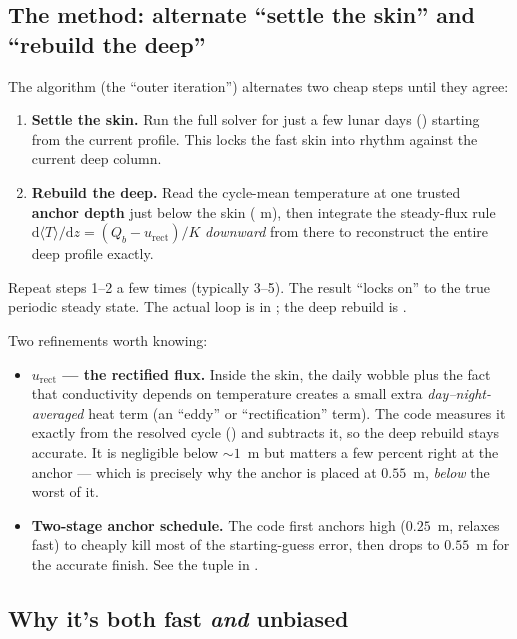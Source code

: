 \subsection{The method: alternate ``settle the skin'' and ``rebuild the deep''}

The algorithm (the ``outer iteration'') alternates two cheap steps until they
agree:
\begin{enumerate}[leftmargin=1.5em,itemsep=4pt]
  \item \textbf{Settle the skin.} Run the full solver for just a few lunar days
    () starting from the current profile. This locks the fast
    skin into rhythm against the current deep column.
  \item \textbf{Rebuild the deep.} Read the cycle-mean temperature at one trusted
    \textbf{anchor depth} just below the skin ( m), then
    integrate the steady-flux rule
    $\mathrm{d}\langle T\rangle/\mathrm{d}z = (Q_b - u_{\mathrm{rect}})/K$
    \emph{downward} from there to reconstruct the entire deep profile exactly.
\end{enumerate}
Repeat steps 1--2 a few times (typically 3--5). The result ``locks on'' to the
true periodic steady state. The actual loop is 
in ; the deep rebuild is .

Two refinements worth knowing:
\begin{itemize}[leftmargin=1.4em,itemsep=3pt]
  \item \textbf{$u_{\mathrm{rect}}$ --- the rectified flux.} Inside the skin, the
    daily wobble plus the fact that conductivity depends on temperature creates a
    small extra \emph{day--night-averaged} heat term (an ``eddy'' or
    ``rectification'' term). The code measures it exactly from the resolved cycle
    () and subtracts it, so the deep rebuild stays
    accurate. It is negligible below ${\sim}1$~m but matters a few percent right
    at the anchor --- which is precisely why the anchor is placed at
    $0.55$~m, \emph{below} the worst of it.
  \item \textbf{Two-stage anchor schedule.} The code first anchors high
    ($0.25$~m, relaxes fast) to cheaply kill most of the starting-guess error,
    then drops to $0.55$~m for the accurate finish. See the  tuple
    in .
\end{itemize}

\subsection{Why it's both fast \emph{and} unbiased}

